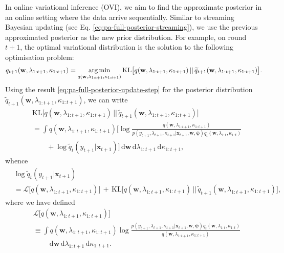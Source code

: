 In online variational inference (OVI), we aim to find the approximate posterior in an online setting where the data arrive sequentially. Similar to streaming Bayesian updating (see Eq. \eqref{eq:pa-full-posterior-streaming}), we use the previous approximated posterior as the new prior distribution. For example, on round $t+1$, the optimal variational distribution is the solution to the following optimisation problem:
\begin{equation}
	q_{t+1}(\mathbf{w}, \lambda_{1:t+1}, \kappa_{1:t+1})
	= \operatorname*{arg\,min}_{q(\mathbf{w}, \lambda_{1:t+1}, \kappa_{1:t+1})}
	\mathrm{KL}\big[q(\mathbf{w}, \lambda_{1:t+1}, \kappa_{1:t+1}) \, || \, \widetilde{q}_{t+1}(\mathbf{w}, \lambda_{1:t+1}, \kappa_{1:t+1})\big].
\end{equation}
Using the result \eqref{eq:pa-full-posterior-update-step} for the posterior distribution $\widetilde{q}_{t+1}(\mathbf{w}, \lambda_{1:t+1}, \kappa_{1:t+1})$, we can write
\begin{equation}
\begin{split}
	& \mathrm{KL}\big[q(\mathbf{w}, \lambda_{1:t+1}, \kappa_{1:t+1}) \, || \, \widetilde{q}_{t+1}(\mathbf{w}, \lambda_{1:t+1}, \kappa_{1:t+1})\big]
	\\
	&= \int q(\mathbf{w}, \lambda_{1:t+1}, \kappa_{1:t+1})\Big[\log\frac{q(\mathbf{w}, \lambda_{1:t+1}, \kappa_{1:t+1})}{p(y_{t+1}, \lambda_{t+1}, \kappa_{t+1}|\mathbf{x}_{t+1}, \mathbf{w}, \boldsymbol{\psi})q_{t}(\mathbf{w}, \lambda_{1:t}, \kappa_{1:t})} 
	\\
	& \qquad + \log \widetilde{q}_{t}(y_{t+1}|\mathbf{x}_{t+1})\Big]\,\mathrm{d}\mathbf{w}\,\mathrm{d}\lambda_{1:t+1}\,\mathrm{d}\kappa_{1:t+1},
\end{split}
\end{equation}
whence
\begin{equation}
\begin{split}
\label{eq:approximate-marginal-likelihood-contribution-with-elbo}
	& \log \widetilde{q}_{t}(y_{t+1}|\mathbf{x}_{t+1})
	\\	
	&= \mathcal{L}\big[q(\mathbf{w}, \lambda_{1:t+1}, \kappa_{1:t+1})\big] \, + \, \mathrm{KL}\big[q(\mathbf{w}, \lambda_{1:t+1}, \kappa_{1:t+1}) \, || \, \widetilde{q}_{t+1}(\mathbf{w}, \lambda_{1:t+1}, \kappa_{1:t+1})\big],
\end{split}
\end{equation}
where we have defined
\begin{equation}
\label{eq:pa-elbow}
\begin{split}
	& \mathcal{L}\big[q(\mathbf{w}, \lambda_{1:t+1}, \kappa_{1:t+1})\big]
	\\	
	&\equiv \int q(\mathbf{w}, \lambda_{1:t+1}, \kappa_{1:t+1})\log\frac{p(y_{t+1}, \lambda_{t+1}, \kappa_{t+1}|\mathbf{x}_{t+1}, \mathbf{w}, \boldsymbol{\psi})q_{t}(\mathbf{w}, \lambda_{1:t}, \kappa_{1:t})}{q(\mathbf{w}, \lambda_{1:t+1}, \kappa_{1:t+1})}
	\\
	& \qquad \;\mathrm{d}\mathbf{w}\,\mathrm{d}\lambda_{1:t+1}\,\mathrm{d}\kappa_{1:t+1}.
\end{split}
\end{equation}

